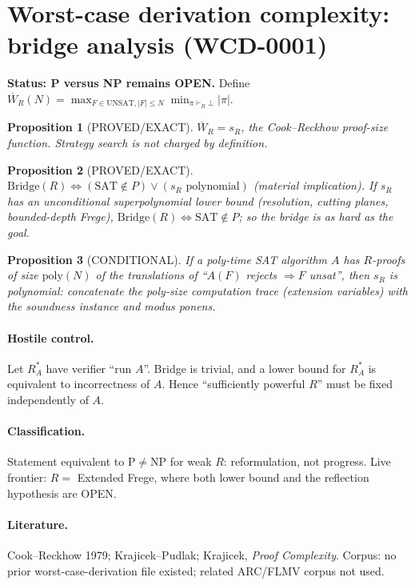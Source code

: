 \documentclass{article}\usepackage{amsmath,amssymb,amsthm}
\newtheorem{prop}{Proposition}
\begin{document}
\section*{Worst-case derivation complexity: bridge analysis (WCD-0001)}
\textbf{Status: P versus NP remains OPEN.}
Define $\overline W_R(N)=\max_{F\in\mathrm{UNSAT},|F|\le N}\min_{\pi\vdash_R\bot}|\pi|$.
\begin{prop}[PROVED/EXACT] $\overline W_R=s_R$, the Cook--Reckhow proof-size function. Strategy search is not charged by definition.\end{prop}
\begin{prop}[PROVED/EXACT] $\mathrm{Bridge}(R)\iff(\mathrm{SAT}\notin P)\vee(s_R\text{ polynomial})$ (material implication). If $s_R$ has an unconditional superpolynomial lower bound (resolution, cutting planes, bounded-depth Frege), $\mathrm{Bridge}(R)\iff \mathrm{SAT}\notin P$; so the bridge is as hard as the goal.\end{prop}
\begin{prop}[CONDITIONAL] If a poly-time SAT algorithm $A$ has $R$-proofs of size $\mathrm{poly}(N)$ of the translations of ``$A(F)$ rejects $\Rightarrow F$ unsat'', then $s_R$ is polynomial: concatenate the poly-size computation trace (extension variables) with the soundness instance and modus ponens.\end{prop}
\paragraph{Hostile control.} Let $R^*_A$ have verifier ``run $A$''. Bridge is trivial, and a lower bound for $R^*_A$ is equivalent to incorrectness of $A$. Hence ``sufficiently powerful $R$'' must be fixed independently of $A$.
\paragraph{Classification.} Statement equivalent to P$\ne$NP for weak $R$: reformulation, not progress. Live frontier: $R=$ Extended Frege, where both lower bound and the reflection hypothesis are OPEN.
\paragraph{Literature.} Cook--Reckhow 1979; Krajicek--Pudlak; Krajicek, \emph{Proof Complexity}. Corpus: no prior worst-case-derivation file existed; related ARC/FLMV corpus not used.
\end{document}
